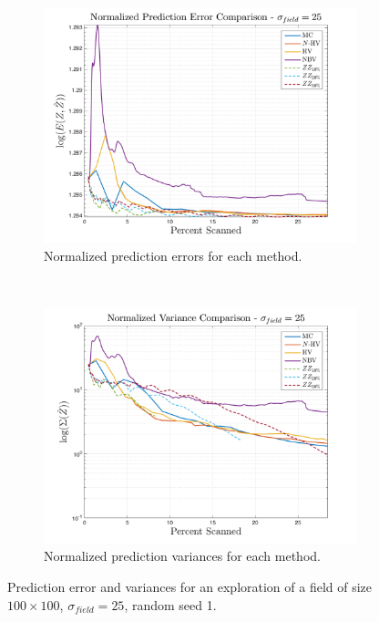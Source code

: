 \begin{figure}[htb!]
    \centering
    \begin{subfigure}[t]{0.75\textwidth}
        \centering
        \includegraphics[width=\linewidth]{figures/normalized_errors_30p_100x100_sf_25_seed_1_app_10}
        \captionsetup{skip=0.20\baselineskip,size=footnotesize}
        \caption{Normalized prediction errors for each method.}
    \end{subfigure}%
    \\
    \begin{subfigure}[t]{0.75\textwidth}
        \centering
        \includegraphics[width=\linewidth]{figures/normalized_variances_30p_100x100_sf_25_seed_1_app_10}
        \captionsetup{skip=0.20\baselineskip,size=footnotesize}
        \caption{Normalized prediction variances for each method.}
    \end{subfigure}%
    \captionsetup{skip=0.20\baselineskip}
    \caption{Prediction error and variances for an exploration of a field of size $100 \times 100$, $\sigma_{field} = 25$, random seed 1.}
    \label{fig:errvar25}
\end{figure}

